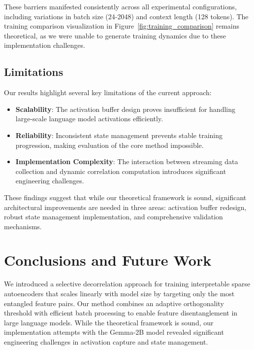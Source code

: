 \documentclass{article} %
\begin{document}
These barriers manifested consistently across all experimental configurations, including variations in batch size (24-2048) and context length (128 tokens). The training comparison visualization in Figure~\ref{fig:training_comparison} remains theoretical, as we were unable to generate training dynamics due to these implementation challenges.

\subsection{Limitations}
Our results highlight several key limitations of the current approach:

\begin{itemize}
    \item \textbf{Scalability}: The activation buffer design proves insufficient for handling large-scale language model activations efficiently.
    
    \item \textbf{Reliability}: Inconsistent state management prevents stable training progression, making evaluation of the core method impossible.
    
    \item \textbf{Implementation Complexity}: The interaction between streaming data collection and dynamic correlation computation introduces significant engineering challenges.
\end{itemize}

These findings suggest that while our theoretical framework is sound, significant architectural improvements are needed in three areas: activation buffer redesign, robust state management implementation, and comprehensive validation mechanisms.

\section{Conclusions and Future Work}
\label{sec:conclusion}

We introduced a selective decorrelation approach for training interpretable sparse autoencoders that scales linearly with model size by targeting only the most entangled feature pairs. Our method combines an adaptive orthogonality threshold with efficient batch processing to enable feature disentanglement in large language models. While the theoretical framework is sound, our implementation attempts with the Gemma-2B model revealed significant engineering challenges in activation capture and state management.
\end{document}
